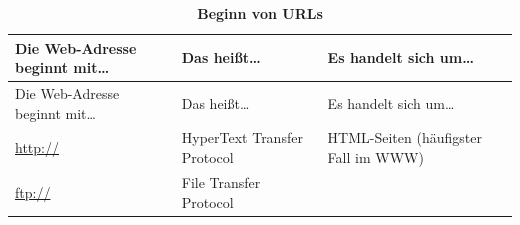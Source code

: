 \documentclass[]{book}
\theoremstyle{definition}
\theoremstyle{definition}
\theoremstyle{definition}
\theoremstyle{remark}
\begin{document}
\begin{longtable}[]{@{}lll@{}}
\caption{\textbf{\label{tab:urls} Beginn von URLs}}\tabularnewline
\toprule
\begin{minipage}[b]{0.31\columnwidth}\raggedright\strut
Die Web-Adresse beginnt mit\ldots{}\strut
\end{minipage} & \begin{minipage}[b]{0.27\columnwidth}\raggedright\strut
Das heißt\ldots{}\strut
\end{minipage} & \begin{minipage}[b]{0.33\columnwidth}\raggedright\strut
Es handelt sich um\ldots{}\strut
\end{minipage}\tabularnewline
\midrule
\endfirsthead
\toprule
\begin{minipage}[b]{0.31\columnwidth}\raggedright\strut
Die Web-Adresse beginnt mit\ldots{}\strut
\end{minipage} & \begin{minipage}[b]{0.27\columnwidth}\raggedright\strut
Das heißt\ldots{}\strut
\end{minipage} & \begin{minipage}[b]{0.33\columnwidth}\raggedright\strut
Es handelt sich um\ldots{}\strut
\end{minipage}\tabularnewline
\midrule
\endhead
\begin{minipage}[t]{0.31\columnwidth}\raggedright\strut
\url{http://} \vspace{5mm}\strut
\end{minipage} & \begin{minipage}[t]{0.27\columnwidth}\raggedright\strut
HyperText Transfer Protocol \vspace{5mm}\strut
\end{minipage} & \begin{minipage}[t]{0.33\columnwidth}\raggedright\strut
HTML-Seiten (häufigster Fall im WWW) \vspace{5mm}\strut
\end{minipage}\tabularnewline
\begin{minipage}[t]{0.31\columnwidth}\raggedright\strut
\url{ftp://} \vspace{5mm}\strut
\end{minipage} & \begin{minipage}[t]{0.27\columnwidth}\raggedright\strut
File Transfer Protocol \vspace{5mm}\strut
\end{minipage} & \begin{minipage}[t]{0.33\columnwidth}\raggedright\strut

\end{minipage}
\end{longtable}
\end{document}
